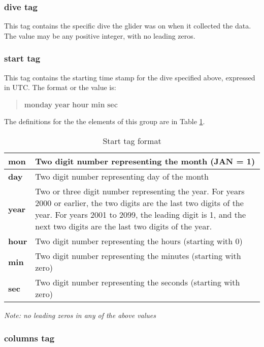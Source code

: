 \documentclass[12pt,english,twoside]{book}
\providecommand{\tabularnewline}{\\}
\begin{document}
\subsubsection{dive tag}

This tag contains the specific dive the glider was on when it collected
the data. The value may be any positive integer, with no leading zeros.


\subsubsection{start tag}

This tag contains the starting time stamp for the dive specified above,
expressed in UTC. The format or the value is:

\begin{quote}
\textbf{mon}\space\textbf{day} \textbf{year} \textbf{hour} \textbf{min}
\textbf{sec} 
\end{quote}
The definitions for the the elements of this group are in Table \ref{StartTag}.

%
\begin{table}
\begin{centering}\begin{tabular}{|l|p{4.5in}|}
\hline 
\textbf{mon} &
Two digit number representing the month (JAN = 1) \tabularnewline
\hline 
\textbf{day} &
Two digit number representing day of the month \tabularnewline
\hline 
\textbf{year} &
Two or three digit number representing the year. For years 2000 or
earlier, the two digits are the last two digits of the year. For years
2001 to 2099, the leading digit is 1, and the next two digits are
the last two digits of the year. \tabularnewline
\hline 
\textbf{hour} &
Two digit number representing the hours (starting with 0) \tabularnewline
\hline 
\textbf{min} &
Two digit number representing the minutes (starting with zero) \tabularnewline
\hline 
\textbf{sec} &
Two digit number representing the seconds (starting with zero) \tabularnewline
\hline
\end{tabular}\par\end{centering}


\caption{Start tag format}

\label{StartTag} 
\end{table}


\textit{Note: no leading zeros in any of the above values}


\subsubsection{columns tag}
\end{document}
